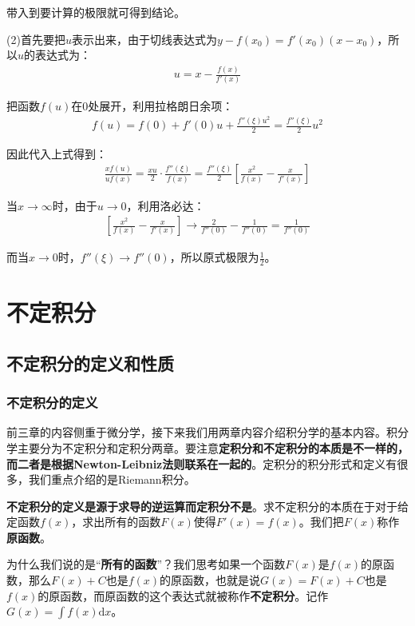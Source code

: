 \documentclass{ctexart}
\let\oldtextbf\textbf %
\renewcommand{\textbf}[1]{\textcolor{btex}{\oldtextbf{#1}}} %
\begin{document}
带入到要计算的极限就可得到结论。

(2)首先要把$u$表示出来，由于切线表达式为$y-f(x_0)=f'(x_0)(x-x_0)$，所以$u$的表达式为：
\begin{align*}
    u=x-\frac{f(x)}{f'(x)}
\end{align*}

把函数$f(u)$在0处展开，利用拉格朗日余项：
\begin{align*}
    f(u)=f(0)+f'(0)u+\frac{f''(\xi)u^2}{2}=\frac{f''(\xi)}{2}u^2
\end{align*}

因此代入上式得到：
\begin{align*}
    \frac{xf(u)}{uf(x)}=\frac{xu}{2}\cdot\frac{f''(\xi)}{f(x)}=\frac{f''(\xi)}{2}\left[\frac{x^2}{f(x)}-\frac{x}{f'(x)}\right]
\end{align*}

当$x\to\infty$时，由于$u\to 0$，利用洛必达：
\begin{align*}
    \left[\frac{x^2}{f(x)}-\frac{x}{f'(x)}\right]\to \frac{2}{f''(0)}-\frac{1}{f''(0)}=\frac{1}{f''(0)}
\end{align*}

而当$x\to 0$时，$f''(\xi)\to f''(0)$，所以原式极限为$\frac{1}{2}$。

\section{不定积分}
\subsection{不定积分的定义和性质}
\subsubsection{不定积分的定义}
前三章的内容侧重于微分学，接下来我们用两章内容介绍积分学的基本内容。积分学主要分为不定积分和定积分两章。要注意\textbf{定积分和不定积分的本质是不一样的，而二者是根据Newton-Leibniz法则联系在一起的}。定积分的积分形式和定义有很多，我们重点介绍的是Riemann积分。

\textbf{不定积分的定义是源于求导的逆运算而定积分不是}。求不定积分的本质在于对于给定函数$f(x)$，求出所有的函数$F(x)$使得$F'(x)=f(x)$。我们把$F(x)$称作\textbf{原函数}。

为什么我们说的是“\textbf{所有的函数}”？我们思考如果一个函数$F(x)$是$f(x)$的原函数，那么$F(x)+C$也是$f(x)$的原函数，也就是说$G(x)=F(x)+C$也是$f(x)$的原函数，而原函数的这个表达式就被称作\textbf{不定积分}。记作$G(x)=\int f(x)\mathrm{d}x$。
\end{document}
